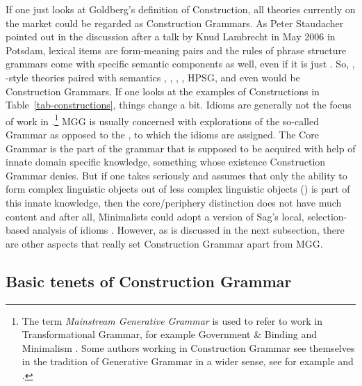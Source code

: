 \documentclass[output=paper
	        ,collection
	        ,collectionchapter
 	        ,biblatex
                ,babelshorthands
                ,newtxmath
                ,draftmode
                ,colorlinks, citecolor=brown
]{langscibook}
\begin{document}
If one just looks at Goldberg's definition of Construction, all theories currently on the market could be
regarded as Construction Grammars. As Peter Staudacher pointed out in the discussion after a talk by
Knud Lambrecht in May 2006 in Potsdam, lexical items are form-meaning pairs and the rules of
phrase structure grammars come with specific semantic components as well, even if it is just
.
So, \cg, -style theories paired with semantics \citep{HK98a-u}, \gpsg, \treeag,
\lfg, HPSG, and even \minimalism would be Construction Grammars. If one looks at the
examples of Constructions in Table~\ref{tab-constructions}, things change a bit. Idioms are generally
not the focus of work in .\footnote{
  The term \emph{Mainstream Generative Grammar} is used to refer to work in Transformational
  Grammar, for example Government \& Binding \citep{Chomsky81a} and Minimalism
  \citep{Chomsky95a-u}. Some authors working in Construction Grammar see themselves in the tradition of
  Generative Grammar in a wider sense, see for example \citet*[]{FKoC88a} and \citet[]{Fillmore88a}.%
} MGG is usually concerned with explorations of the so-called  Grammar as opposed to the , to which the
idioms are assigned.
The Core Grammar is the part of the grammar that is supposed to be acquired with
help of innate domain specific knowledge, something whose existence Construction Grammar
denies. But if one takes \citet*{HCF2002a} seriously and assumes that only the ability to form complex
linguistic objects out of less complex linguistic objects () is part of this innate knowledge,
then the core/periphery distinction does not have much content and after all, Minimalists could adopt
a version of Sag's local, selection-based analysis of idioms \parencites{Sag2007a}{KSF2015a}{KM2019a}.
However, as is discussed in the next subsection, there are other aspects that really set Construction Grammar apart from
MGG.

\subsection{Basic tenets of Construction Grammar}
\label{sec-tenets}
\end{document}
